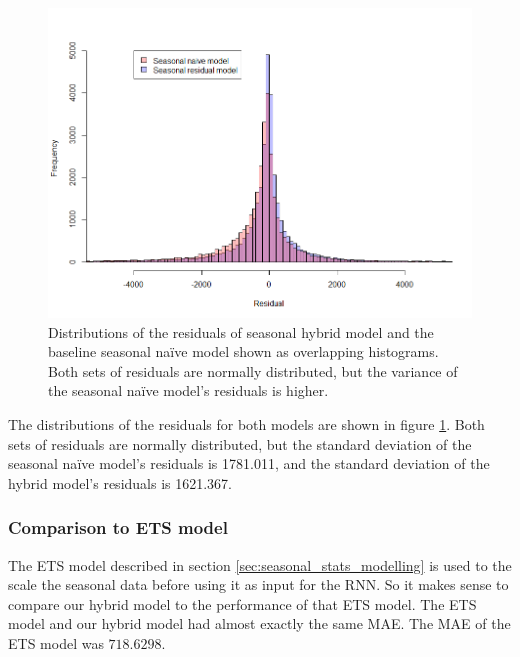 \documentclass[a4paper,12pt]{article}
\theoremstyle{definition}
\begin{document}
\begin{figure}[ht]
	\centering
	\includegraphics[width=\textwidth]{figures/seasonal_res_vs_seasonal_naive.png}
	\caption{Distributions of the residuals of seasonal hybrid model and the baseline seasonal na{\"i}ve model shown as overlapping histograms. Both sets of residuals are normally distributed, but the variance of the seasonal na{\"i}ve model's residuals is higher.}
	\label{fig:seasonal_res_vs_seasonal_naive}
\end{figure}

The distributions of the residuals for both models are shown in figure \ref{fig:seasonal_res_vs_seasonal_naive}. Both sets of residuals are normally distributed, but the standard deviation of the seasonal na{\"i}ve model's residuals is 1781.011, and the standard deviation of the hybrid model's residuals is 1621.367.

\subsubsection{Comparison to ETS model}
The ETS model described in section \ref{sec:seasonal_stats_modelling} is used to the scale the seasonal data before using it as input for the RNN. So it makes sense to compare our hybrid model to the performance of that ETS model. The ETS model and our hybrid model had almost exactly the same MAE. The MAE of the ETS model was $718.6298$.
\end{document}
